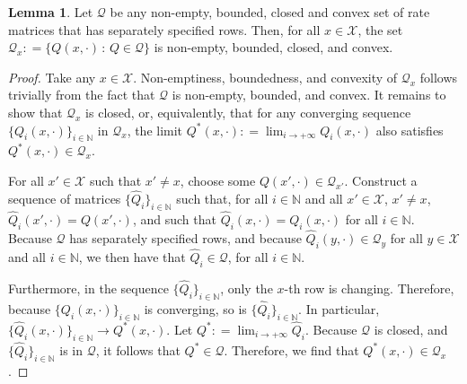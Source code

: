 \documentclass[10pt,a4paper]{paper}
\theoremstyle{definition}
\newtheorem{lemma}[theorem]{Lemma}
\newcommand{\nats}{\mathbb{N}}
\newcommand{\states}{\mathcal{X}}
\newcommand{\rateset}{\mathcal{Q}}
\newcommand{\coloneqq}{:\!=}
\begin{document}
\begin{lemma}\label{lemma:rows_nonempty_bounded_closed_convex}
Let $\rateset$ be any non-empty, bounded, closed and convex set of rate matrices that has separately specified rows. Then, for all $x\in\states$, the set $\rateset_x\coloneqq\{Q(x,\cdot)\,:\,Q\in\rateset\}$ is non-empty, bounded, closed, and convex.
\end{lemma}
\begin{proof}
Take any $x\in\states$. Non-emptiness, boundedness, and convexity of $\rateset_x$ follows trivially from the fact that $\rateset$ is non-empty, bounded, and convex. It remains to show that $\rateset_x$ is closed, or, equivalently, that for any converging sequence $\{Q_i(x,\cdot)\}_{i\in\nats}$ in $\rateset_x$, the limit $Q^*(x,\cdot)\coloneqq\lim_{i\to+\infty}Q_i(x,\cdot)$ also satisfies $Q^*(x,\cdot)\in\rateset_x$.

For all $x'\in\states$ such that $x'\neq x$, choose some $Q(x',\cdot)\in\rateset_{x'}$. Construct a sequence of matrices $\{\hat{Q}_i\}_{i\in\nats}$ such that, for all $i\in\nats$ and all $x'\in\states$, $x'\neq x$, $\hat{Q}_i(x',\cdot)=Q(x',\cdot)$, and such that $\hat{Q}_i(x,\cdot)=Q_i(x,\cdot)$ for all $i\in\nats$. Because $\rateset$ has separately specified rows, and because $\hat{Q}_i(y,\cdot)\in\rateset_y$ for all $y\in\states$ and all $i\in\nats$, we then have that $\hat{Q}_i\in\rateset$, for all $i\in\nats$.

Furthermore, in the sequence $\{\hat{Q}_i\}_{i\in\nats}$, only the $x$-th row is changing. Therefore, because $\{Q_i(x,\cdot)\}_{i\in\nats}$ is converging, so is $\{\hat{Q}_i\}_{i\in\nats}$. In particular, $\{\hat{Q}_i(x,\cdot)\}_{i\in\nats}\to Q^*(x,\cdot)$. Let $Q^*\coloneqq\lim_{i\to+\infty}\hat{Q}_i$. Because $\rateset$ is closed, and $\{\hat{Q}_i\}_{i\in\nats}$ is in $\rateset$, it follows that $Q^*\in\rateset$. Therefore, we find that $Q^*(x,\cdot)\in\rateset_x$.
\end{proof}
\end{document}
